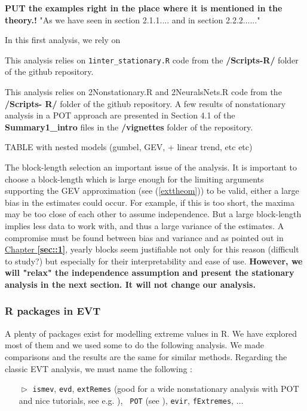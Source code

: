 \textbf{PUT the examples right in the place where it is mentioned in the theory.!} 
"As we have seen in section 2.1.1.... and in section 2.2.2......"

In this first analysis, we rely on 

This analysis relies on \texttt{1inter\_stationary.R} code from the \textbf{/Scripts-R/} folder of the github repository.

This analysis relies on 2Nonstationary.R and 2NeuralsNets.R code from the\textbf{ /Scripts-
R/} folder of the github repository. A few results of nonstationary analysis in a POT approach are
presented in Section 4.1 of the \textbf{Summary1\_intro} files in the \textbf{/vignettes} folder of the repository. 

TABLE with nested models (gumbel, GEV, + linear trend, etc etc)


The block-length selection an important issue of the analysis. It is important to choose a block-length which is large enough for the limiting arguments supporting the GEV approximation (see (\ref{exttheom})) to be valid, either a large bias in the estimates could occur. For example, if this is too short, the maxima may be too close of each other to assume independence. But a large block-length implies less data to work with, and thus a large variance of the estimates. A compromise must be found between bias and variance and as pointed out in \hyperref[sec::1]{Chapter \textbf{\ref{sec::1}}}, yearly blocks seem justifiable not only for this reason (difficult to study?) but especially for their interpretability and ease of use.
\textbf{However, we will "relax" the independence assumption and present the stationary analysis in the next section. It will not change our analysis.}

\subsubsection*{R packages in EVT}

A plenty of packages exist for modelling extreme values in R. We have explored most of them and we used some to do the following analysis. We made comparisons and the results are the same for similar methods. Regarding the classic EVT analysis, we must name the following : 
\vspace*{-.2cm}
\begin{itemize}
	\item[$\vartriangleright$] \texttt{ismev}, \texttt{evd}, \texttt{extRemes} (good for a wide nonstationary analysis with POT and nice tutorials, see e.g. \citet{gilleland_extremes_2016}), \texttt{ POT} (see \citet{ribatet_users_2006}), \texttt{evir}, \texttt{fExtremes}, $\dots$
\end{itemize}

